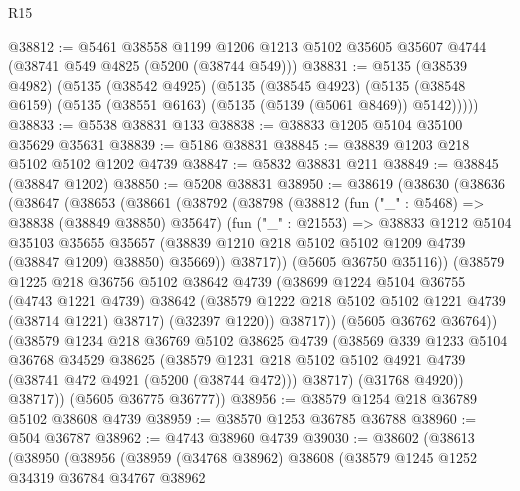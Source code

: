 \begin{lexlean}{R15}
\begin{coremodule}
{{{{{{{{{{{@38812 := @5461
    @38558
    @1199
    @1206
    @1213
    @5102
    @35605
    @35607
    @4744
    (@38741 @549 @4825 (@5200 (@38744 @549)))
@38831 := @5135
    (@38539 @4982)
    (@5135
      (@38542 @4925)
      (@5135
        (@38545 @4923)
        (@5135 (@38548 @6159) (@5135 (@38551 @6163) (@5135 (@5139 (@5061 @8469)) @5142)))))
@38833 := @5538 @38831 @133
@38838 := @38833 @1205 @5104 @35100 @35629 @35631
@38839 := @5186 @38831
@38845 := @38839 @1203 @218 @5102 @5102 @1202 @4739
@38847 := @5832 @38831 @211
@38849 := @38845 (@38847 @1202)
@38850 := @5208 @38831
@38950 := @38619
    (@38630
      (@38636
        (@38647
          (@38653
            (@38661
              (@38792
                (@38798
                  (@38812
                    (fun ("_" : @5468) => @38838 (@38849 @38850) @35647)
                    (fun ("_" : @21553) =>
                    @38833
                      @1212
                      @5104
                      @35103
                      @35655
                      @35657
                      (@38839 @1210 @218 @5102 @5102 @1209 @4739 (@38847 @1209) @38850)
                      @35669))
                  @38717))
              (@5605 @36750 @35116))
            (@38579
              @1225
              @218
              @36756
              @5102
              @38642
              @4739
              (@38699
                @1224
                @5104
                @36755
                (@4743 @1221 @4739)
                @38642
                (@38579 @1222 @218 @5102 @5102 @1221 @4739 (@38714 @1221) @38717)
                (@32397 @1220))
              @38717))
          (@5605 @36762 @36764))
        (@38579
          @1234
          @218
          @36769
          @5102
          @38625
          @4739
          (@38569
            @339
            @1233
            @5104
            @36768
            @34529
            @38625
            (@38579
              @1231
              @218
              @5102
              @5102
              @4921
              @4739
              (@38741 @472 @4921 (@5200 (@38744 @472)))
              @38717)
            (@31768 @4920))
          @38717))
      (@5605 @36775 @36777))
@38956 := @38579 @1254 @218 @36789 @5102 @38608 @4739
@38959 := @38570 @1253 @36785 @36788
@38960 := @504 @36787
@38962 := @4743 @38960 @4739
@39030 := @38602
    (@38613
      (@38950
        (@38956
          (@38959
            (@34768 @38962)
            @38608
            (@38579
              @1245
              @1252
              @34319
              @36784
              @34767
              @38962
}}}}}}}}}}}
\end{coremodule}
\end{lexlean}
